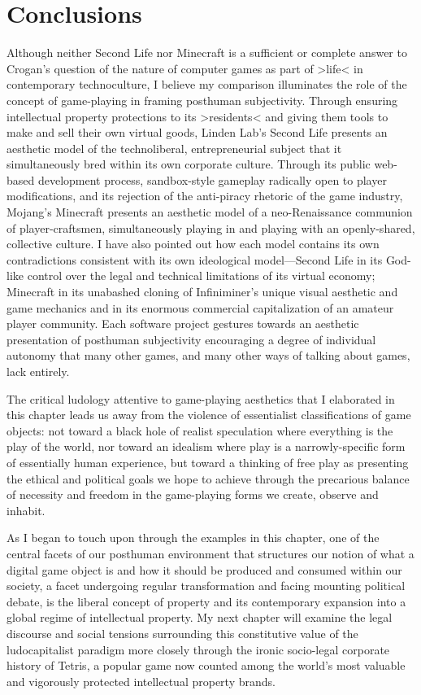 \section{Conclusions}
Although neither Second Life nor Minecraft is a sufficient or complete answer to Crogan's question of the nature of computer games as part of >life< in contemporary technoculture, I believe my comparison illuminates the role of the concept of game-playing in framing posthuman subjectivity. Through ensuring intellectual property protections to its >residents< and giving them tools to make and sell their own virtual goods, Linden Lab's Second Life presents an aesthetic model of the technoliberal, entrepreneurial subject that it simultaneously bred within its own corporate culture. Through its public web-based development process, sandbox-style gameplay radically open to player modifications, and its rejection of the anti-piracy rhetoric of the game industry, Mojang's Minecraft presents an aesthetic model of a neo-Renaissance communion of player-craftsmen, simultaneously playing in and playing with an openly-shared, collective culture. I have also pointed out how each model contains its own contradictions consistent with its own ideological model---Second Life in its God-like control over the legal and technical limitations of its virtual economy; Minecraft in its unabashed cloning of Infiniminer's unique visual aesthetic and game mechanics and in its enormous commercial capitalization of an amateur player community. Each software project gestures towards an aesthetic presentation of posthuman subjectivity encouraging a degree of individual autonomy that many other games, and many other ways of talking about games, lack entirely.

The critical ludology attentive to game-playing aesthetics that I elaborated in this chapter leads us away from the violence of essentialist classifications of game objects: not toward a black hole of realist speculation where everything is the play of the world, nor toward an idealism where play is a narrowly-specific form of essentially human experience, but toward a thinking of free play as presenting the ethical and political goals we hope to achieve through the precarious balance of necessity and freedom in the game-playing forms we create, observe and inhabit.

As I began to touch upon through the examples in this chapter, one of the central facets of our posthuman environment that structures our notion of what a digital game object is and how it should be produced and consumed within our society, a facet undergoing regular transformation and facing mounting political debate, is the liberal concept of property and its contemporary expansion into a global regime of intellectual property. My next chapter will examine the legal discourse and social tensions surrounding this constitutive value of the ludocapitalist paradigm more closely through the ironic socio-legal corporate history of Tetris, a popular game now counted among the world's most valuable and vigorously protected intellectual property brands.